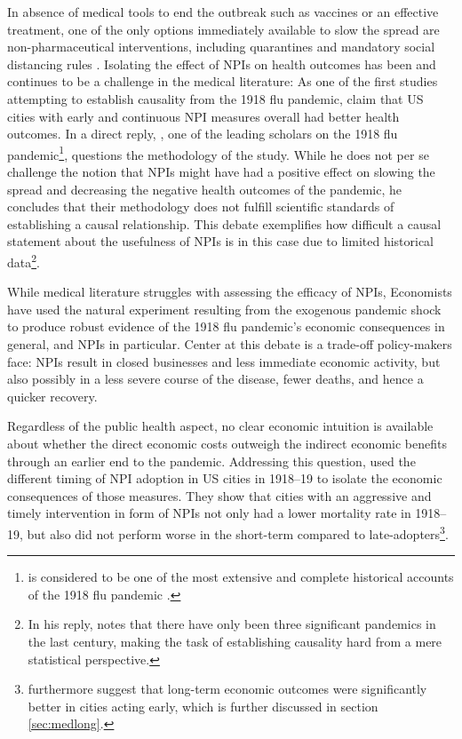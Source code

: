\documentclass[12pt,a4paper]{article}
\begin{document}
In absence of medical tools to end the outbreak such as vaccines or an effective treatment, one of the only options  immediately available to slow the spread are non-pharmaceutical interventions, including quarantines and mandatory social distancing rules \citep{aledortNonpharmaceuticalPublicHealth2007}.
Isolating the effect of NPIs on health outcomes has been and continues to be a challenge in the medical literature:
As one of the first studies attempting to establish causality from the 1918 flu pandemic, \cite{markelNonpharmaceuticalInterventionsImplemented2007} claim that US cities with early and continuous NPI measures overall had better health outcomes.
In a direct reply, \cite{barryCommentsNonpharmaceuticalInterventions2007}, one of the leading scholars on the 1918 flu pandemic\footnote{
	\cite{barryGreatInfluenzaEpic2005} is considered to be one of the most extensive and complete historical accounts of the 1918 flu pandemic \citep[see comment by the editor]{barryCommentsNonpharmaceuticalInterventions2007}.}, questions the methodology of the study.
While he does not per se challenge the notion that NPIs might have had a positive effect on slowing the spread and decreasing the negative health outcomes of the pandemic, he concludes that their methodology does not fulfill scientific standards of establishing a causal relationship.
This debate exemplifies how difficult a causal statement about the usefulness of NPIs is in this case due to limited historical data\footnote{In his reply, \cite{barryCommentsNonpharmaceuticalInterventions2007} notes that there have only been three significant pandemics in the last century, making the task of establishing causality hard from a mere statistical perspective.}.

While medical literature struggles with assessing the efficacy of NPIs, Economists have used the natural experiment resulting from the exogenous pandemic shock to produce robust evidence of the 1918 flu pandemic's economic consequences in general, and NPIs in particular.
Center at this debate is a trade-off policy-makers face: NPIs result in closed businesses and less immediate economic activity, but also possibly in a less severe course of the disease, fewer deaths, and hence a quicker recovery.

Regardless of the public health aspect, no clear economic intuition is available about whether the direct economic costs outweigh the indirect economic benefits through an earlier end to the pandemic.
Addressing this question, \cite{correiaPandemicsDepressEconomy2020} used the different timing of NPI adoption in US cities in 1918--19 to isolate the economic consequences of those measures.
They show that cities with an aggressive and timely intervention in form of NPIs not only had a lower mortality rate in 1918--19, but also did not perform worse in the short-term compared to late-adopters\footnote{\cite{correiaPandemicsDepressEconomy2020} furthermore suggest that long-term economic outcomes were significantly better in cities acting early, which is further discussed in section \ref{sec:medlong}.}.
\end{document}
